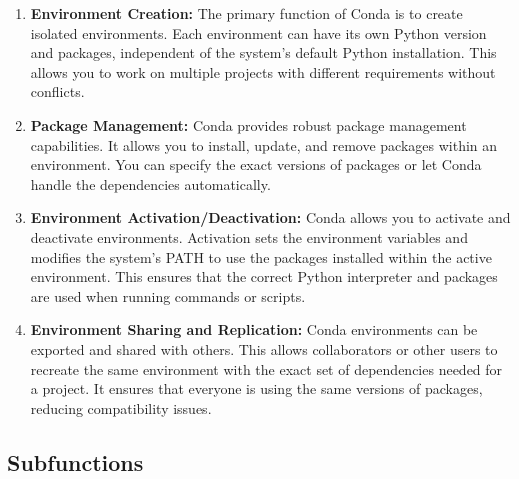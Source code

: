 \begin{enumerate}
	\item \textbf{Environment Creation:} The primary function of Conda is to create isolated environments. Each environment can have its own Python version and packages, independent of the system's default Python installation. This allows you to work on multiple projects with different requirements without conflicts.
	
	\item \textbf{Package Management:} Conda provides robust package management capabilities. It allows you to install, update, and remove packages within an environment. You can specify the exact versions of packages or let Conda handle the dependencies automatically.
	
	\item \textbf{Environment Activation/Deactivation:} Conda allows you to activate and deactivate environments. Activation sets the environment variables and modifies the system's PATH to use the packages installed within the active environment. This ensures that the correct Python interpreter and packages are used when running commands or scripts.
	
	\item \textbf{Environment Sharing and Replication:} Conda environments can be exported and shared with others. This allows collaborators or other users to recreate the same environment with the exact set of dependencies needed for a project. It ensures that everyone is using the same versions of packages, reducing compatibility issues.
\end{enumerate}

\subsection{Subfunctions}

